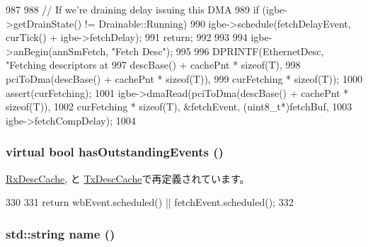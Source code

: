 \begin{DoxyCode}
987 {
988     // If we're draining delay issuing this DMA
989     if (igbe->getDrainState() != Drainable::Running) {
990         igbe->schedule(fetchDelayEvent, curTick() + igbe->fetchDelay);
991         return;
992     }
993 
994     igbe->anBegin(annSmFetch, "Fetch Desc");
995 
996     DPRINTF(EthernetDesc, "Fetching descriptors at %
997             descBase() + cachePnt * sizeof(T),
998             pciToDma(descBase() + cachePnt * sizeof(T)),
999             curFetching * sizeof(T));
1000     assert(curFetching);
1001     igbe->dmaRead(pciToDma(descBase() + cachePnt * sizeof(T)),
1002                   curFetching * sizeof(T), &fetchEvent, (uint8_t*)fetchBuf,
1003                   igbe->fetchCompDelay);
1004 }
\end{DoxyCode}
\hypertarget{classIGbE_1_1DescCache_a09989bc9720a200c8164dc1ef109d70b}{
\subsubsection[{hasOutstandingEvents}]{\setlength{\rightskip}{0pt plus 5cm}virtual bool hasOutstandingEvents ()}}
\label{classIGbE_1_1DescCache_a09989bc9720a200c8164dc1ef109d70b}


\hyperlink{classIGbE_1_1RxDescCache_a2587421ae644a9474416e5a5b63ccbca}{RxDescCache}, と \hyperlink{classIGbE_1_1TxDescCache_a2587421ae644a9474416e5a5b63ccbca}{TxDescCache}で再定義されています。


\begin{DoxyCode}
330                                             {
331             return wbEvent.scheduled() || fetchEvent.scheduled();
332         }
\end{DoxyCode}
\hypertarget{classIGbE_1_1DescCache_af1801e31af6399bccce114ab12575168}{
\subsubsection[{name}]{\setlength{\rightskip}{0pt plus 5cm}std::string name ()}}
\label{classIGbE_1_1DescCache_af1801e31af6399bccce114ab12575168}



